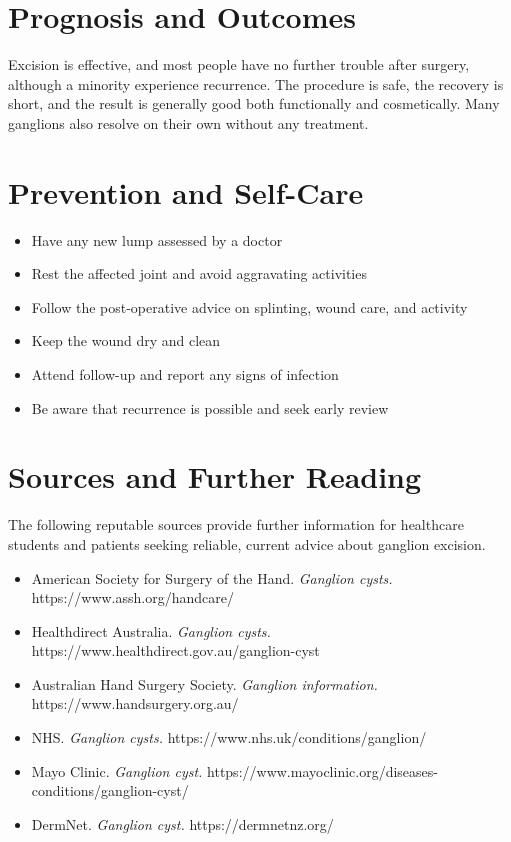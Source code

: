 \section*{Prognosis and Outcomes}
Excision is effective, and most people have no further trouble after surgery, although a minority experience recurrence. The procedure is safe, the recovery is short, and the result is generally good both functionally and cosmetically. Many ganglions also resolve on their own without any treatment.

\section*{Prevention and Self-Care}
\begin{itemize}
    \item Have any new lump assessed by a doctor
    \item Rest the affected joint and avoid aggravating activities
    \item Follow the post-operative advice on splinting, wound care, and activity
    \item Keep the wound dry and clean
    \item Attend follow-up and report any signs of infection
    \item Be aware that recurrence is possible and seek early review
\end{itemize}

\section*{Sources and Further Reading}
The following reputable sources provide further information for healthcare students and patients seeking reliable, current advice about ganglion excision.
\begin{itemize}
    \item American Society for Surgery of the Hand. \textit{Ganglion cysts.} https://www.assh.org/handcare/
    \item Healthdirect Australia. \textit{Ganglion cysts.} https://www.healthdirect.gov.au/ganglion-cyst
    \item Australian Hand Surgery Society. \textit{Ganglion information.} https://www.handsurgery.org.au/
    \item NHS. \textit{Ganglion cysts.} https://www.nhs.uk/conditions/ganglion/
    \item Mayo Clinic. \textit{Ganglion cyst.} https://www.mayoclinic.org/diseases-conditions/ganglion-cyst/
    \item DermNet. \textit{Ganglion cyst.} https://dermnetnz.org/
\end{itemize}
